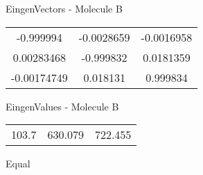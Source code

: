 \begin{multicols}{2}
\begin{center}
\vtab
 EingenVectors - Molecule B     \\
\vtab
\begin{tabular}{|c c c|}
-0.999994	 & 	-0.0028659	 & 	-0.0016958	 \\
0.00283468	 & 	-0.999832	 & 	0.0181359	 \\
-0.00174749	 & 	0.018131	 & 	0.999834
\end{tabular}

\vtab
 EingenValues - Molecule B     \\
\vtab
\begin{tabular}{|c c c|}
103.7	 & 	630.079	 & 	722.455	 \\
\end{tabular}

\end{center}
\end{multicols}
\begin{center}
\vtab
\vtab
\textcolor{NavyBlue}{\Large Equal}
\end{center}

 \newpage

